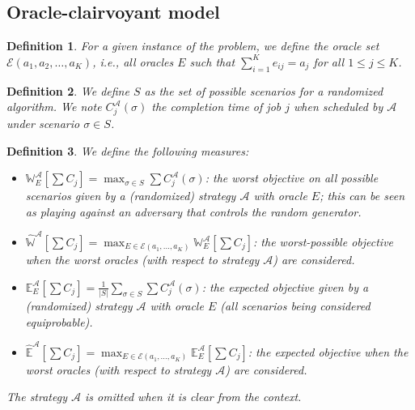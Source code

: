 \documentclass{article}
\newtheorem{definition}{Definition}
\begin{document}
\subsection{Oracle-clairvoyant model}

\begin{definition}
    For a given instance of the problem, we define the \emph{oracle set} \(\mathcal{E}(a_1,a_2,\ldots,a_K)\), i.e., all oracles \(E\) such that \(\sum_{i=1}^{K} e_{ij}=a_j\) for all \(1\le j\le K\).
\end{definition}

\begin{definition}
    We define \(S\) as the set of possible scenarios for a randomized algorithm.
    We note \(C^{\mathcal{A}}_j(\sigma)\) the completion time of job \(j\) when scheduled by \(\mathcal{A}\) under scenario \(\sigma\in S\).
\end{definition}

\newcommand{\W}{\mathbb{W}}
\newcommand{\E}{\mathbb{E}}

\begin{definition}
    We define the following measures:
    \begin{itemize}
        \item \(\W^{\mathcal{A}}_E\left[\sum C_j\right]=\max_{\sigma\in S}\sum C^{\mathcal{A}}_j(\sigma)\):
        the worst objective on all possible scenarios given by a (randomized) strategy \(\mathcal{A}\) with oracle \(E\); this can be seen as playing against an adversary that controls the random generator.
        \item \(\widehat{\W}^{\mathcal{A}}\left[\sum C_j\right]=\max_{E\in\mathcal{E}(a_1,\ldots,a_K)} \W^{\mathcal{A}}_E\left[\sum C_j\right]\):
        the worst-possible objective when the worst oracles (with respect to strategy \(\mathcal{A}\)) are considered.
        \item \(\E^{\mathcal{A}}_E\left[\sum C_j\right]=\frac{1}{|S|}\sum_{\sigma\in S}\sum C^{\mathcal{A}}_j(\sigma)\):
        the expected objective given by a (randomized) strategy \(\mathcal{A}\) with oracle \(E\) (all scenarios being considered equiprobable).
        \item \(\widehat{\E}^{\mathcal{A}}\left[\sum C_j\right]=\max_{E\in\mathcal{E}(a_1,\ldots,a_K)} \E^{\mathcal{A}}_E\left[\sum C_j\right]\):
        the expected objective when the worst oracles (with respect to strategy \(\mathcal{A}\)) are considered.
    \end{itemize}
    The strategy \(\mathcal{A}\) is omitted when it is clear from the context.
\end{definition}
\end{document}

